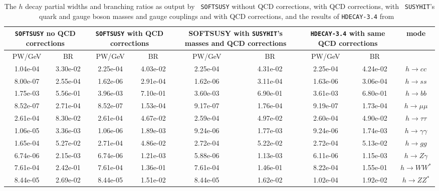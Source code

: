\documentclass[final,3p,times,pdflatex]{elsarticle}
\begin{document}
\begin{center}
\begin{table} %
\centering
\begin{tabular}{|c|c|c|c|c|c|c|c|c|} \hline
\multicolumn{2}{|C{3.0cm}|}{{\tt SOFTSUSY} no QCD corrections} & \multicolumn{2}{C{3.0cm}|}{{\tt SOFTSUSY} with QCD corrections} & \multicolumn{2}{C{3.0cm}|}{SOFTSUSY with {\tt SUSYHIT}'s masses and QCD corrections} & \multicolumn{2}{C{3.0cm}|}{{\tt HDECAY-3.4} with same QCD corrections} & mode \\ \hline
PW/GeV & BR & PW/GeV & BR & PW/GeV & BR & PW/GeV & BR & \\ \hline
1.04e-04 & 3.30e-02 & 2.25e-04 & 4.03e-02 & 2.25e-04 & 4.31e-02 & 2.25e-04 & 4.24e-02 & $h \rightarrow c c$ \\ \hline
8.00e-07 & 2.55e-04 & 1.62e-06 & 2.91e-04 & 1.62e-06 & 3.11e-04 & 1.63e-06 & 3.06e-04 & $h \rightarrow s s$ \\ \hline
1.75e-03 & 5.56e-01 & 3.96e-03 & 7.10e-01 & 3.60e-03 & 6.90e-01 & 3.61e-03 & 6.80e-01 & $h \rightarrow b b$ \\ \hline
8.52e-07 & 2.71e-04 & 8.52e-07 & 1.53e-04 & 9.17e-07 & 1.76e-04 & 9.19e-07 & 1.73e-04 & $h \rightarrow \mu \mu$ \\ \hline
2.61e-04 & 8.30e-02 & 2.61e-04 & 4.67e-02 & 2.59e-04 & 4.97e-02 & 2.60e-04 & 4.90e-02 & $h \rightarrow \tau \tau$ \\ \hline
1.06e-05 & 3.36e-03 & 1.06e-06 & 1.89e-03 & 9.24e-06 & 1.77e-03 & 9.24e-06 & 1.74e-03 & $h \rightarrow \gamma \gamma$ \\ \hline
1.65e-04 & 5.27e-02 & 2.71e-04 & 4.86e-02 & 2.72e-04 & 5.22e-02 & 2.72e-04 & 5.13e-02 & $h \rightarrow g g$ \\ \hline
6.74e-06 & 2.15e-03 & 6.74e-06 & 1.21e-03 & 5.88e-06 & 1.13e-03 & 6.11e-06 & 1.15e-03 & $h \rightarrow Z \gamma$ \\ \hline
7.61e-04 & 2.42e-01 & 7.61e-04 & 1.36e-01 & 7.61e-04 & 1.46e-01 & 8.22e-04 & 1.55e-01 & $h \rightarrow W W^*$ \\ \hline
8.44e-05 & 2.69e-02 & 8.44e-05 & 1.51e-02 & 8.44e-05 & 1.62e-02 & 1.02e-04 & 1.92e-02 & $h \rightarrow Z Z^*$ \\ \hline
\end{tabular}
\caption{The $h$ decay partial widths and branching ratios as output by {\tt
    SOFTSUSY} without QCD corrections, with QCD corrections, with {\tt
    SUSYHIT}'s quark and gauge boson masses and gauge couplings and with QCD
  corrections, and the results of {\tt HDECAY-3.4} from {\tt
}}
\end{table}
\end{center}
\end{document}
